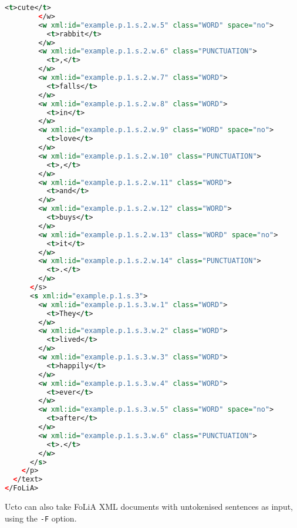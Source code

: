 \documentclass[a4paper,12pt]{report}
\begin{document}
\begin{lstlisting}[language=xml]
          <t>cute</t>
        </w>
        <w xml:id="example.p.1.s.2.w.5" class="WORD" space="no">
          <t>rabbit</t>
        </w>
        <w xml:id="example.p.1.s.2.w.6" class="PUNCTUATION">
          <t>,</t>
        </w>
        <w xml:id="example.p.1.s.2.w.7" class="WORD">
          <t>falls</t>
        </w>
        <w xml:id="example.p.1.s.2.w.8" class="WORD">
          <t>in</t>
        </w>
        <w xml:id="example.p.1.s.2.w.9" class="WORD" space="no">
          <t>love</t>
        </w>
        <w xml:id="example.p.1.s.2.w.10" class="PUNCTUATION">
          <t>,</t>
        </w>
        <w xml:id="example.p.1.s.2.w.11" class="WORD">
          <t>and</t>
        </w>
        <w xml:id="example.p.1.s.2.w.12" class="WORD">
          <t>buys</t>
        </w>
        <w xml:id="example.p.1.s.2.w.13" class="WORD" space="no">
          <t>it</t>
        </w>
        <w xml:id="example.p.1.s.2.w.14" class="PUNCTUATION">
          <t>.</t>
        </w>
      </s>
      <s xml:id="example.p.1.s.3">
        <w xml:id="example.p.1.s.3.w.1" class="WORD">
          <t>They</t>
        </w>
        <w xml:id="example.p.1.s.3.w.2" class="WORD">
          <t>lived</t>
        </w>
        <w xml:id="example.p.1.s.3.w.3" class="WORD">
          <t>happily</t>
        </w>
        <w xml:id="example.p.1.s.3.w.4" class="WORD">
          <t>ever</t>
        </w>
        <w xml:id="example.p.1.s.3.w.5" class="WORD" space="no">
          <t>after</t>
        </w>
        <w xml:id="example.p.1.s.3.w.6" class="PUNCTUATION">
          <t>.</t>
        </w>
      </s>
    </p>
  </text>
</FoLiA>
\end{lstlisting}

Ucto can also take FoLiA XML documents with untokenised sentences as input, using the \texttt{-F} option.



\end{document}
